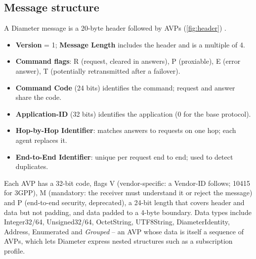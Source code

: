 \documentclass[11pt,a4paper]{article}
\begin{document}
\subsection{Message structure}
A Diameter message is a 20-byte header followed by AVPs (\cref{fig:header}) \cite{rfc6733}.
\begin{itemize}
  \item \textbf{Version} = 1; \textbf{Message Length} includes the header and is a multiple of 4.
  \item \textbf{Command flags}: R (request, cleared in answers), P (proxiable), E (error answer),
        T (potentially retransmitted after a failover).
  \item \textbf{Command Code} (24 bits) identifies the command; request and answer share the code.
  \item \textbf{Application-ID} (32 bits) identifies the application (0 for the base protocol).
  \item \textbf{Hop-by-Hop Identifier}: matches answers to requests on one hop; each agent replaces it.
  \item \textbf{End-to-End Identifier}: unique per request end to end; used to detect duplicates.
\end{itemize}
Each AVP has a 32-bit code, flags V (vendor-specific: a Vendor-ID follows; 10415 for 3GPP), M (mandatory:
the receiver must understand it or reject the message) and P (end-to-end security, deprecated), a 24-bit
length that covers header and data but not padding, and data padded to a 4-byte boundary. Data types
include Integer32/64, Unsigned32/64, OctetString, UTF8String, DiameterIdentity, Address, Enumerated and
\emph{Grouped} -- an AVP whose data is itself a sequence of AVPs, which lets Diameter express nested
structures such as a subscription profile.

\begin{acnfigure}
  \caption{Diameter header (left) and AVP (right). Each row is 32 bits.}
  \label{fig:header}
\end{acnfigure}
\end{document}
